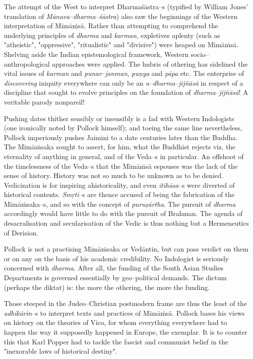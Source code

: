 The attempt of the West to interpret Dharmaśāstra–s (typified by William Jones’ translation of \textit{Mānava–dharma–śāstra}) also saw the beginnings of the Western interpretation of Mīmāṁsā. Rather than attempting to comprehend the underlying principles of \textit{dharma} and \textit{karman}, expletives aplenty (such as "atheistic", "oppressive", "ritualistic" and "divisive") were heaped on Mīmāṁsā. Shelving aside the Indian epistemological framework, Western socio–anthropological approaches were applied. The hubris of othering has sidelined the vital issues of \textit{karman} and \textit{punar–janman}, \textit{puṇya} and \textit{pāpa} etc. The enterprise of \textit{discovering} iniquity everywhere can only be an \textit{a–dharma–jijñāsā} in respect of a discipline that sought to evolve principles on the foundation of \textit{dharma–jijñāsā}! A veritable parody nonpareil!

Pushing dates thither sensibly or insensibly is a fad with Western Indologists (one ironically noted by Pollock himself); and toeing the same line nevertheless, Pollock imperiously pushes Jaimini to a date centuries later than the Buddha. The Mīmāṁsaka sought to assert, for him, what the Buddhist rejects viz. the eternality of anything in general, and of the Veda–s in particular. An offshoot of the timelessness of the Veda–s that the Mīmāṁsā espouses was the lack of the sense of history. History was not so much to be unknown as to be denied. Vedicization is for inspiring ahistoricality, and even \textit{itihāsa}–s were diverted of historical contents. \textit{Smṛti}–s are thence accused of being the fabrication of the Mīmāṁsaka–s, and so with the concept of \textit{puruṣārtha}. The pursuit of \textit{dharma} accordingly would have little to do with the pursuit of Brahman. The agenda of desacralisation and secularisation of the Vedic is thus nothing but a Hermeneutics of Derision.

Pollock is not a practising Mīmāṁsaka or Vedāntin, but can pass verdict on them or on any on the basis of his academic credibility. No Indologist is seriously concerned with \textit{dharma}. After all, the funding of the South Asian Studies Departments is governed essentially by geo–political demands. The dictum (perhaps the diktat) is: the more the othering, the more the funding.

 Those steeped in the Judeo–Christian postmodern frame are thus the least of the \textit{adhikārin}–s to interpret texts and practices of Mīmāṁsā. Pollock bases his views on history on the theories of Vico, for whom everything everywhere had to happen the way it supposedly happened in Europe, the exemplar. It is to counter this that Karl Popper had to tackle the fascist and communist belief in the "inexorable laws of historical destiny".

